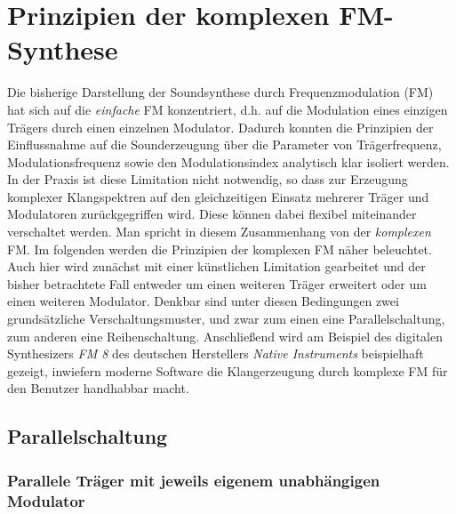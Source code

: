 \section{Prinzipien der komplexen FM-Synthese}
\label{PrinzipKomplexFM}

Die bisherige Darstellung der Soundsynthese durch Frequenzmodulation (FM) hat sich auf die \textit{einfache} FM konzentriert, d.h. auf die Modulation eines einzigen Trägers durch einen einzelnen Modulator. Dadurch konnten die Prinzipien der Einflussnahme auf die Sounderzeugung über die Parameter von Trägerfrequenz, Modulationsfrequenz sowie den Modulationsindex analytisch klar isoliert werden. In der Praxis ist diese Limitation nicht notwendig, so dass zur Erzeugung komplexer Klangspektren auf den gleichzeitigen Einsatz mehrerer Träger und Modulatoren zurückgegriffen wird. Diese können dabei flexibel miteinander verschaltet werden. Man spricht in diesem Zusammenhang von der \textit{komplexen} FM. Im folgenden werden die Prinzipien der komplexen FM näher beleuchtet. Auch hier wird zunächst mit einer künstlichen Limitation gearbeitet und der bisher betrachtete Fall entweder um einen weiteren Träger erweitert oder um einen weiteren Modulator. Denkbar sind unter diesen Bedingungen zwei grundsätzliche Verschaltungsmuster, und zwar zum einen eine Parallelschaltung, zum anderen eine Reihenschaltung. Anschließend wird am Beispiel des digitalen Synthesizers \textit{FM 8} des deutschen Herstellers \textit{Native Instruments} beispielhaft gezeigt, inwiefern moderne Software die Klangerzeugung durch komplexe FM für den Benutzer handhabbar macht. 

\subsection{Parallelschaltung}

\subsubsection{Parallele Träger mit jeweils eigenem unabhängigen Modulator}


